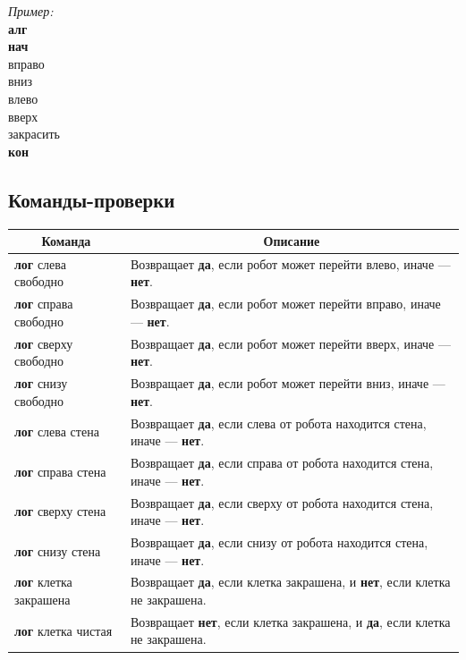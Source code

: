 \emph{Пример:}\\
{\sffamily
\textbf{алг}\\
\textbf{нач}\\
\otstup вправо\\
\otstup вниз\\
\otstup влево\\
\otstup вверх\\
\otstup закрасить\\
\textbf{кон}
}

\subsection{Команды-проверки}

\begin{center}
\begin{tabular}{||p{4.2cm}|p{11.8cm}||}
\hline
\hline
\multicolumn{1}{||c|}{\bfseries Команда} & \multicolumn{1}{|c||}{\bfseries Описание}\\
\hline
	\textbf{лог} слева свободно &
	Возвращает \textbf{да}, если робот может перейти влево, иначе --- \textbf{нет}.\\
	
	\textbf{лог} справа свободно &
	Возвращает \textbf{да}, если робот может перейти вправо, иначе --- \textbf{нет}. \\
	
	\textbf{лог} сверху свободно &
	Возвращает \textbf{да}, если робот может перейти вверх, иначе --- \textbf{нет}. \\
	
	\textbf{лог} снизу свободно &
	Возвращает \textbf{да}, если робот может перейти вниз, иначе --- \textbf{нет}. \\

	\textbf{лог} слева стена &
	Возвращает \textbf{да}, если слева от робота находится стена, иначе --- \textbf{нет}. \\
	
	\textbf{лог} справа стена &
	Возвращает \textbf{да}, если справа от робота находится стена, иначе --- \textbf{нет}. \\
	
	\textbf{лог} сверху стена &
	Возвращает \textbf{да}, если сверху от робота находится стена, иначе --- \textbf{нет}. \\
	
	\textbf{лог} снизу стена &
	Возвращает \textbf{да}, если снизу от робота находится стена, иначе --- \textbf{нет}. \\

	\textbf{лог} клетка закрашена &
	Возвращает \textbf{да}, если клетка закрашена, и \textbf{нет}, если клетка не закрашена. \\

	\textbf{лог} клетка чистая &
	Возвращает \textbf{нет}, если клетка закрашена, и \textbf{да}, если клетка не закрашена. \\
\hline
\hline
\end{tabular}
\end{center}

